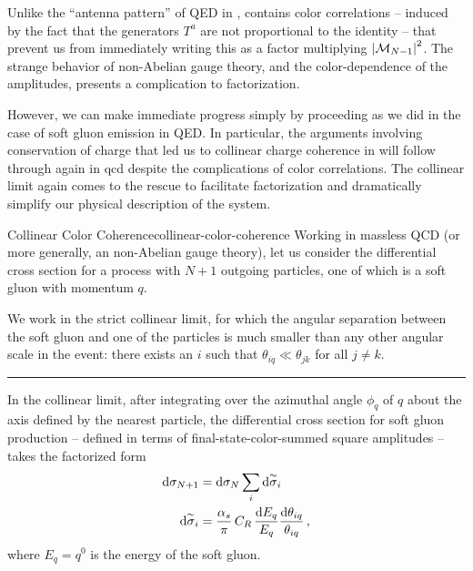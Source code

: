 Unlike the ``antenna pattern'' of QED in ,  contains color correlations -- induced by the fact that the generators \(T^a\) are not proportional to the identity -- that prevent us from immediately writing this as a factor multiplying \(\abs{\mathcal{M}_{N-1}}^2\).
%
The strange behavior of non-Abelian gauge theory, and the color-dependence of the amplitudes, presents a complication to factorization.

However, we can make immediate progress simply by proceeding as we did in the case of soft gluon emission in QED.
%
In particular, the arguments involving conservation of charge that led us to collinear charge coherence in  will follow through again in \gls{qcd} despite the complications of color correlations.
%
The collinear limit again comes to the rescue to facilitate factorization and dramatically simplify our physical description of the system.



\begin{lemma}{Collinear Color Coherence}{collinear-color-coherence}
    Working in massless QCD (or more generally, an non-Abelian gauge theory), let us consider the differential cross section for a process with \(N+1\) outgoing particles, one of which is a soft gluon with momentum \(q\).

    We work in the strict collinear limit, for which the angular separation between the soft gluon and one of the particles is much smaller than any other angular scale in the event:
    there exists an \(i\) such that \(\theta_{iq} \ll \theta_{jk}\) for all \(j \neq k\).

    \vspace{7pt}
    \hrule
    \vspace{7pt}

    In the collinear limit, after integrating over the azimuthal angle \(\phi_{q}\) of \(q\) about the axis defined by the nearest particle, the differential cross section for soft gluon production -- defined in terms of final-state-color-summed square amplitudes -- takes the factorized form
    \begin{align}
        \label{eq:soft-gluon-factorization}
        \dd \sigma_{N+1}
        &=
        \dd\sigma_N
        \sum_i\dsigmatilde_i
        \\
        \label{eq:soft-gluon-splitting-probability}
        \dsigmatilde_i
        &=
        \frac{\alpha_s}{\pi}
        \,
        C_R
        \,
        \frac{\dd E_q}{E_q}
        \frac{\dd\theta_{iq}}{\theta_{iq}}
        \,,
    \end{align}
    where \(E_q = q^0\) is the energy of the soft gluon.
\end{lemma}


